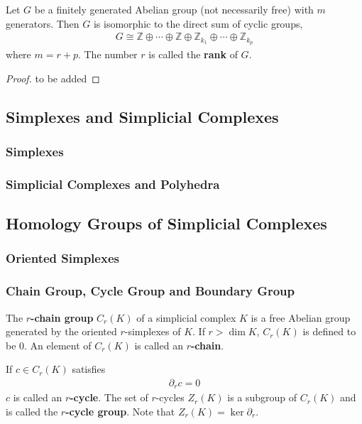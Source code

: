 \documentclass[10pt]{article}
\begin{document}
\begin{theorem}
    Let $G$ be a finitely generated Abelian group (not necessarily free) with $m$ generators.
    Then $G$ is isomorphic to the direct sum of cyclic groups,
    \begin{align}
        G\cong\mathbb{Z}\oplus\cdots\oplus\mathbb{Z}\oplus\mathbb{Z}_{k_1}\oplus\cdots\oplus\mathbb{Z}_{k_p}
    \end{align}
    where $m=r+p$.
    The number $r$ is called the \textbf{rank} of $G$.
\end{theorem}
\begin{proof}
    to be added
\end{proof}


\subsection{Simplexes and Simplicial Complexes}
\subsubsection{Simplexes}
\subsubsection{Simplicial Complexes and Polyhedra}
\subsection{Homology Groups of Simplicial Complexes}
\subsubsection{Oriented Simplexes\label{OrientedSimplexes}}
\subsubsection{Chain Group, Cycle Group and Boundary Group\label{ChainGroupCycleGroupandBoundaryGroup}}
\begin{definition}
    The \textbf{$r$-chain group} $C_r(K)$ of a simplicial complex $K$ is a free Abelian group generated by the oriented $r$-simplexes of $K$.
    If $r>\dim K$, $C_r(K)$ is defined to be 0.
    An element of $C_r(K)$ is called an \textbf{$r$-chain}.
\end{definition}

\begin{definition}
    If $c\in C_r(K)$ satisfies
    \begin{align}
        \partial_r c=0
    \end{align}
    $c$ is called an \textbf{$r$-cycle}.
    The set of $r$-cycles $Z_r(K)$ is a subgroup of $C_r(K)$ and is called the \textbf{$r$-cycle group}.
    Note that $Z_r(K)=\ker\partial_r$.
\end{definition}
\end{document}
